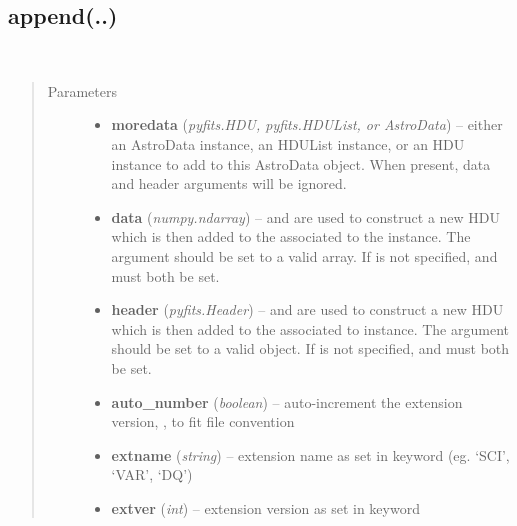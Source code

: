 \documentclass[letterpaper,10pt,english]{sphinxmanual}
\begin{document}
\subsection{append(..)}
\label{chapter_AstroDataClass:append}

\begin{fulllineitems}
\label{chapter_AstroDataClass:astrodata.data.AstroData.append}~\begin{quote}\begin{description}
\item[{Parameters}] \leavevmode\begin{itemize}
\item {} 
\textbf{moredata} (\emph{pyfits.HDU, pyfits.HDUList, or AstroData}) -- either an AstroData instance, an HDUList instance, 
or an HDU instance to add to this AstroData object.
When present, data and header arguments will be ignored.

\item {} 
\textbf{data} (\emph{numpy.ndarray}) --  and  are used to construct a new HDU which is then 
added to the  associated to the  instance. The  
argument should be set
to a valid  array. If  is not specified,  and 
must both be set.

\item {} 
\textbf{header} (\emph{pyfits.Header}) --  and  are used
to construct a new HDU which is then added to the  associated to 
 instance. The  argument should be set to a
valid  object. If  is not specified,  and
 must both be set.

\item {} 
\textbf{auto\_number} (\emph{boolean}) -- auto-increment the extension version, , to fit file convention

\item {} 
\textbf{extname} (\emph{string}) -- extension name as set in keyword  (eg. `SCI', `VAR', `DQ')

\item {} 
\textbf{extver} (\emph{int}) -- extension version as set in keyword 


\end{itemize}
\end{description}
\end{quote}
\end{fulllineitems}
\end{document}
